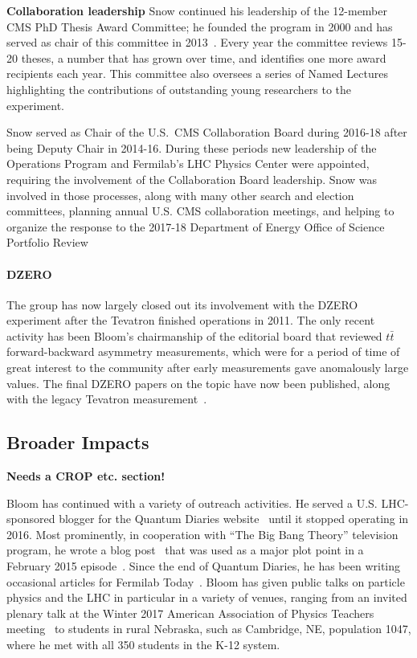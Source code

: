 {\bf Collaboration leadership}
Snow continued his leadership of the 12-member CMS PhD Thesis Award Committee; he founded the program in 2000 and has served as chair of this committee in 2013~\cite{bib:thesisawardwebsite}.  Every year the committee reviews 15-20 theses, a number that has grown over time, and identifies one more award recipients each year.  This committee also oversees a series of Named Lectures highlighting the contributions of outstanding young researchers to the experiment.

Snow served as Chair of the U.S.~CMS Collaboration Board during 2016-18 after being Deputy Chair in 2014-16.  During these periods new leadership of the Operations Program and Fermilab's LHC Physics Center were appointed, requiring the involvement of the Collaboration Board leadership.  Snow was involved in those processes, along with many other search and election committees, planning annual U.S. CMS collaboration meetings, and helping to organize the response to the 2017-18 Department of Energy Office of Science Portfolio Review~\cite{bib:portfolioreview}

\paragraph{DZERO}
The group has now largely closed out its involvement with the DZERO experiment after the Tevatron finished operations in 2011.  The only recent activity has been Bloom's chairmanship of the editorial board that reviewed $t\bar{t}$ forward-backward asymmetry measurements, which were for a period of time of great interest to the community after early measurements gave anomalously large values.  The final DZERO papers on the topic have now been published, along with the legacy Tevatron measurement~\cite{bib:D0afb}.

\subsection{Broader Impacts}

{\bf Needs a CROP etc. section!}

Bloom has continued with a variety of outreach activities.  He served a U.S. LHC-sponsored blogger for the Quantum Diaries website~\cite{bib:bloomblog} until it stopped operating in 2016.  Most prominently, in cooperation with ``The Big Bang Theory'' television program, he wrote a blog post~\cite{bib:TBBTQD} that was used as a major plot point in a February 2015 episode~\cite{bib:TBBTepisode}.  Since the end of Quantum Diaries, he has been writing occasional articles for Fermilab Today~\cite{bib:BloomFNALToday}.  Bloom has given public talks on particle physics and the LHC in particular in a variety of venues, ranging from an invited plenary talk at the Winter 2017 American Association of Physics Teachers meeting~\cite{bib:BloomAAPT} to students in rural Nebraska, such as Cambridge, NE, population 1047, where he met with all 350 students in the K-12 system.

